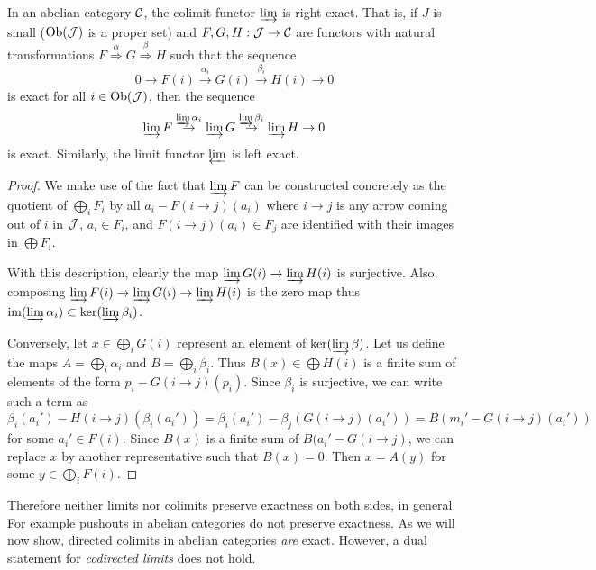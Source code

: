 \begin{prop}
    In an abelian category $\mathcal{C}$, the colimit functor $\varinjlim$ is right exact. That is, if $J$ is small ($\operatorname{Ob}(\mathcal{J})$ is a proper set) and $F,G,H:\mathcal{J}\to \mathcal{C}$ are functors with natural transformations $F\overset{\alpha}{\Longrightarrow}G\overset{\beta}{\Longrightarrow}H$ such that the sequence 
    \[0\to F(i)\overset{\alpha_i}{\to} G(i)\overset{\beta_i}{\to} H(i)\to 0\] is exact for all $i\in\operatorname{Ob}(\mathcal{J})$, then the sequence
    \[\varinjlim F\overset{\varinjlim \alpha_i}{\to}\varinjlim G\overset{\varinjlim \beta_i}{\to}\varinjlim H\to 0\]
    is exact. Similarly, the limit functor $\varprojlim$ is left exact.
\end{prop}
\begin{proof}
    We make use of the fact that $\varinjlim F$ can be constructed concretely as the quotient of $\bigoplus_i F_i$ by all $a_i-F(i\to j)(a_i)$ where $i\to j$ is any arrow coming out of $i$ in $\mathcal{J}$, $a_i\in F_i$, and $F(i\to j)(a_i)\in F_j$ are identified with their images in $\bigoplus F_i$.

    With this description, clearly the map $\varinjlim G(i)\to \varinjlim H(i)$ is surjective. Also, composing $\varinjlim F(i)\to \varinjlim G(i)\to\varinjlim H(i)$ is the zero map thus $\operatorname{im}(\varinjlim \alpha_i)\subset \ker(\varinjlim \beta_i)$.

    Conversely, let $x\in \bigoplus_i G(i)$ represent an element of $\ker(\varinjlim \beta)$. Let us define the maps $A=\bigoplus_i \alpha_i$ and $B=\bigoplus_i \beta_i$. Thus $B(x)\in \bigoplus H(i)$ is a finite sum of elements of the form $p_i-G(i\to j)(p_i)$. Since $\beta_i$ is surjective, we can write such a term as 
    \[\beta_i(a_i')-H(i\to j)(\beta_i(a_i'))=\beta_i(a_i')-\beta_j(G(i\to j)(a_i'))=B(m_i'-G(i\to j)(a_i'))\]
    for some $a_i'\in F(i)$. Since $B(x)$ is a finite sum of $B(a_i'-G(i\to j)$, we can replace $x$ by another representative such that $B(x)=0$. Then $x=A(y)$ for some $y\in \bigoplus_i F(i)$.
\end{proof}

Therefore neither limits nor colimits preserve exactness on both sides, in general. For example pushouts in abelian categories do not preserve exactness. As we will now show, directed colimits in abelian categories \emph{are} exact. However, a dual statement for \emph{codirected limits} does not hold.

